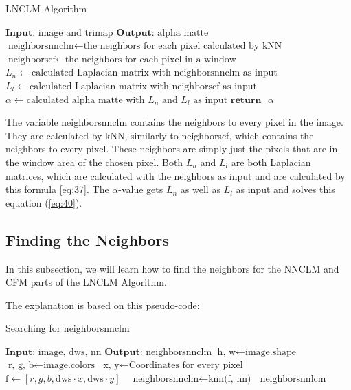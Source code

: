 \begin{algorithm}
	\caption{LNCLM Algorithm}\label{lnclm}
	\begin{algorithmic}[1]
		\State $\textbf{Input: }  \text{image and trimap}$ 
		\State $\textbf{Output: }  \text{alpha matte}$
		\newline
		\State $\text{neighborsnnclm} \gets \text{the neighbors for each pixel calculated by kNN} $
		\State $\text{neighborscf} \gets \text{the neighbors for each pixel in a window} $
		\newline
		\State $ \text{\(L_n \)} \gets \text{calculated Laplacian matrix with neighborsnnclm as input}$
		\State $  \text{\(L_l\)}  \gets \text{calculated Laplacian matrix with neighborscf as input}$
		\newline
		\State $ \text{\(\alpha\)} \gets \text{calculated alpha matte with \(L_n\) and \(L_l\) as input}$
		\State $\textbf{return} \text{ \(\alpha\)}$
	\end{algorithmic}
\end{algorithm}

The variable neighborsnnclm contains the neighbors to every pixel in the image. They are calculated by kNN, similarly to neighborscf, which contains the neighbors to every pixel. These neighbors are simply just the pixels that are in the window area of the chosen pixel. 
Both \(L_n\) and \(L_l\) are both Laplacian matrices, which are calculated with the neighbors as input and are calculated by this formula \ref{eq:37}. 
The \(\alpha\)-value gets \(L_n\) as well as \(L_l\) as input and solves this equation (\ref{eq:40}).


\subsection{Finding the Neighbors}
\label{subsec:neigh}
In this subsection, we will learn how to find the neighbors for the NNCLM and CFM parts of the LNCLM Algorithm. 

The explanation is based on this pseudo-code: 

\begin{algorithm}
	\caption{Searching for neighborsnnclm}\label{neighborsnnclm}
	\begin{algorithmic}[1]
		\State $\textbf{Input: }  \text{image, dws, nn}$
		\State $\textbf{Output: }  \text{neighborsnnclm}$
		\newline
		\State $\text{h, w} \gets \text{image.shape} $
		\State $\text{r, g, b} \gets \text{image.colors} $
		\newline
		\State $\text{x, y} \gets \text{Coordinates for every pixel} $
		\newline
		\State $ \text{f} \gets \text{\([r, g, b, \text{dws} \cdot x,   \text{dws} \cdot y]\) }$
		\State $  \text{neighborsnnclm}  \gets \text{knn(f, nn)}$
		\newline
		\Return $ \text{ neighborsnnlcm}$
	\end{algorithmic}
\end{algorithm}

